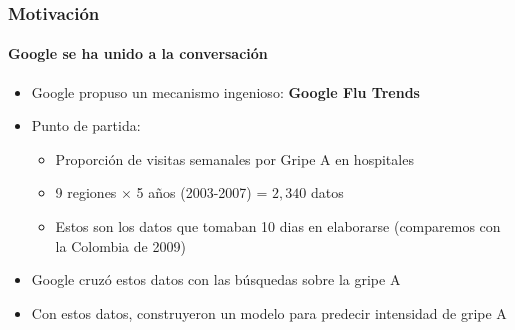 \documentclass[
  shownotes,
  xcolor={svgnames},
  hyperref={colorlinks,citecolor=DarkBlue,linkcolor=DarkRed,urlcolor=DarkBlue}
  , aspectratio=169]{beamer}
\begin{document}

\begin{frame}
\frametitle{Motivación}
\framesubtitle{Google se ha unido a la conversación}

\begin{itemize}
  \item Google propuso un mecanismo ingenioso: {\bf Google Flu Trends}
  \bigskip
  \item Punto de partida: 
  \begin{itemize}
    \item Proporción de visitas semanales por Gripe A en hospitales 
    \item 9 regiones $\times$ 5 años (2003-2007) = $2,340$ datos
    \item Estos son los datos que tomaban 10 dias en elaborarse (comparemos con la Colombia de 2009)
  \end{itemize}
  \bigskip
  \item Google cruzó estos datos con las búsquedas sobre la gripe A
  \bigskip
  \item Con estos datos, construyeron un modelo para predecir intensidad de gripe A  
\end{itemize}  

\end{frame}

\end{document}
